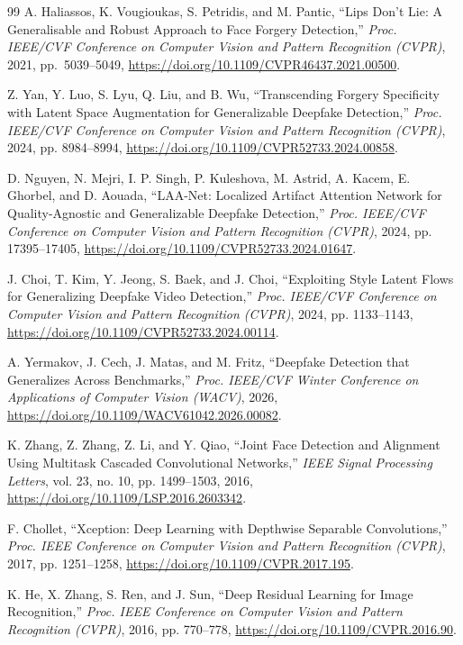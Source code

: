 \documentclass[pdflatex,sn-mathphys-num,iicol]{sn-jnl}
\begin{document}
\begin{thebibliography}{99}
A. Haliassos, K. Vougioukas, S. Petridis, and M. Pantic, ``Lips Don't Lie: A Generalisable and Robust Approach to Face Forgery Detection,'' \textit{Proc. IEEE/CVF Conference on Computer Vision and Pattern Recognition (CVPR)}, 2021, pp.\ 5039--5049, \url{https://doi.org/10.1109/CVPR46437.2021.00500}.

Z. Yan, Y. Luo, S. Lyu, Q. Liu, and B. Wu, ``Transcending Forgery Specificity with Latent Space Augmentation for Generalizable Deepfake Detection,'' \textit{Proc. IEEE/CVF Conference on Computer Vision and Pattern Recognition (CVPR)}, 2024, pp. 8984--8994, \url{https://doi.org/10.1109/CVPR52733.2024.00858}.

D. Nguyen, N. Mejri, I. P. Singh, P. Kuleshova, M. Astrid, A. Kacem, E. Ghorbel, and D. Aouada, ``LAA-Net: Localized Artifact Attention Network for Quality-Agnostic and Generalizable Deepfake Detection,'' \textit{Proc. IEEE/CVF Conference on Computer Vision and Pattern Recognition (CVPR)}, 2024, pp. 17395--17405, \url{https://doi.org/10.1109/CVPR52733.2024.01647}.

J. Choi, T. Kim, Y. Jeong, S. Baek, and J. Choi, ``Exploiting Style Latent Flows for Generalizing Deepfake Video Detection,'' \textit{Proc. IEEE/CVF Conference on Computer Vision and Pattern Recognition (CVPR)}, 2024, pp. 1133--1143, \url{https://doi.org/10.1109/CVPR52733.2024.00114}.

A. Yermakov, J. Cech, J. Matas, and M. Fritz, ``Deepfake Detection that Generalizes Across Benchmarks,'' \textit{Proc. IEEE/CVF Winter Conference on Applications of Computer Vision (WACV)}, 2026, \url{https://doi.org/10.1109/WACV61042.2026.00082}.

K. Zhang, Z. Zhang, Z. Li, and Y. Qiao, ``Joint Face Detection and Alignment Using Multitask Cascaded Convolutional Networks,'' \textit{IEEE Signal Processing Letters}, vol. 23, no. 10, pp. 1499--1503, 2016, \url{https://doi.org/10.1109/LSP.2016.2603342}.

F. Chollet, ``Xception: Deep Learning with Depthwise Separable Convolutions,'' \textit{Proc. IEEE Conference on Computer Vision and Pattern Recognition (CVPR)}, 2017, pp. 1251--1258, \url{https://doi.org/10.1109/CVPR.2017.195}.

K. He, X. Zhang, S. Ren, and J. Sun, ``Deep Residual Learning for Image Recognition,'' \textit{Proc. IEEE Conference on Computer Vision and Pattern Recognition (CVPR)}, 2016, pp. 770--778, \url{https://doi.org/10.1109/CVPR.2016.90}.


\end{thebibliography}
\end{document}
